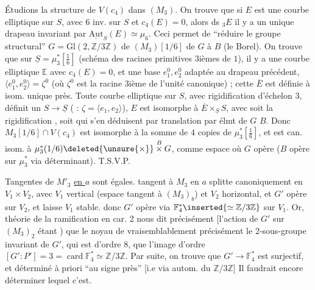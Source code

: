 Étudions la structure de $V(c_4)$ dans $(M_3)$. On trouve que si $E$ est une courbe elliptique sur $S$, avec $6$ inv. sur $S$ et $c_4(E)=0$, alors ds $\mathord{}_3E$ il y a un unique drapeau invariant par $\underline{\mathrm{Aut}}_S(E)\simeq\mu_6$. Ceci permet de ``réduire le groupe structural'' $G=\mathrm{Gl}(2,\mathbb Z/3\mathbb Z)$ de $(M_3)[1/6]$ de $G$ à $B$ (le Borel). On trouve que sur $\underline S=\mu_3^*[\frac16]$ (schéma des racines primitives 3ièmes de $1$),  il y a une courbe elliptique $\mathbb E$ avec $c_4(E)=0$, et une base $e_1^0,e_2^0$ adaptée au drapeau précédent, $\langle e_1^0,e_2^0\rangle=\zeta^0$ (où $\zeta^0$ est la racine 3ième de l'unité canonique) ; cette $\overline E$ est définie à isom. unique près. Toute courbe elliptique  sur $S$, avec rigidification  d'échelon 3, définit un $S\longrightarrow\underline S$ ( : $\zeta=\langle e_1,e_2\rangle$),  $E$ est isomorphe à $\overline E\times_{\underline S} S$, avec  soit la rigidification , soit  qui s'en déduisent par translation par élmt de $G$  $B$. Donc $M_3[1/6]\cap V(c_4)$ est isomorphe à la somme de $4$ copies de $\mu_3^*[\frac16]$, et est can. isom. à $\mu_3^*(1/6)\deleted{\unsure{\times}} \mathbin{\overset B\times}G$, comme espace où $G$ opère ($B$ opère sur $\mu_3^*$ via déterminant). T.S.V.P.

Tangentes  de $M'_3$ \uline{en $a$} sont  égales.   tangent à $M_3$ en $a$ splitte canoniquement en $V_1\times V_2$, avec $V_1$ vertical (espace tangent à $(M_3)_b$) et $V_2$ horizontal, et $G'$ opère  sur $V_2$, et laisse $V_1$ stable. donc $G'$ opère via $\mathbb F_4^*\inserted{\simeq\mathbb Z/3\mathbb Z}$ sur $V_1$. Or,  théorie de la ramification en car. 2 nous dit précisément [l'action de $G'$ sur $(M_3)_2$ étant ) que le noyau de   vraisemblablement précisément le 2-sous-groupe invariant  de $G'$, qui est d'ordre 8,  que l'image   d'ordre  $[G':P']=3=\operatorname{card}\mathbb F_4^*\simeq\mathbb Z/3\mathbb Z$. Par suite, on trouve que $G'\to\mathbb F_4^*$ est surjectif, et déterminé à priori ``au signe près'' [i.e via autom. du  $\mathbb Z/3\mathbb Z$] Il faudrait encore déterminer lequel c'est.

